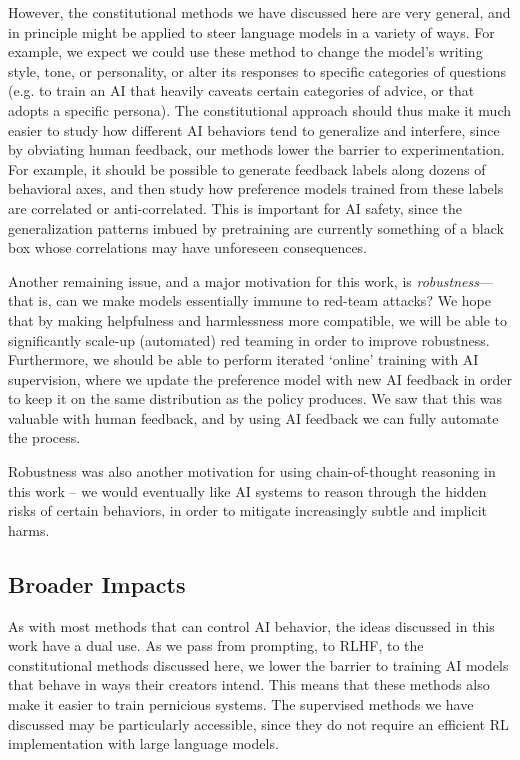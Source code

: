However, the constitutional methods we have discussed here are very general, and in principle might be applied to steer language models in a variety of ways. For example,  we expect we could use these method to change the model's writing style, tone, or personality, or alter its responses to specific categories of questions (e.g. to train an AI that heavily caveats certain categories of advice, or that adopts a specific persona).  The constitutional approach should thus make it much easier to study how different AI behaviors tend to generalize and interfere, since by obviating human feedback, our methods lower the barrier to experimentation.  For example, it should be possible to generate feedback labels along dozens of behavioral  axes, and then study how preference models trained from these labels are correlated or anti-correlated. This is important for AI safety, since the generalization patterns imbued by pretraining are currently something of a black box whose correlations may have unforeseen consequences. 

Another remaining issue, and a major motivation for this work, is {\it robustness}---that is, can we make models essentially immune to red-team attacks?  We hope that by making helpfulness and harmlessness more compatible, we will be able to significantly scale-up (automated) red teaming in order to improve robustness.  Furthermore, we should be able to perform iterated `online' training \cite{bai2022training} with AI supervision, where we update the preference model with new AI feedback in order to keep it on the same distribution as the policy produces.  We saw that this  was valuable with human feedback, and by using AI feedback we can fully automate the process.

Robustness was also another motivation for using chain-of-thought reasoning in this work -- we would eventually like AI systems to reason through the hidden risks of certain behaviors, in order to mitigate increasingly subtle and implicit harms.  

\subsection{Broader Impacts}

As with most methods that can control AI behavior, the ideas discussed in this work have a dual use.  As we pass from prompting, to RLHF, to the constitutional methods discussed here, we lower the barrier to training AI models that behave in ways their creators intend.  This means that these methods also make it easier to train pernicious systems.  The supervised methods we have discussed may be particularly accessible, since they do not require an efficient RL implementation with large language models.


